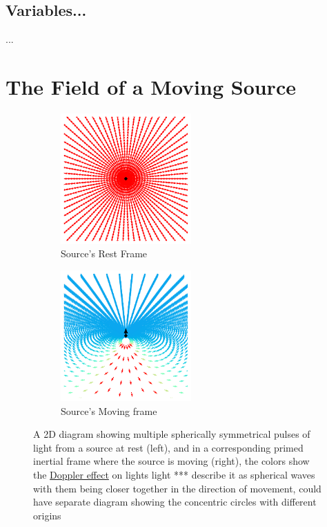 \section{Variables...}

...

\chapter{The Field of a Moving Source}

\begin{figure}[H]
	\begin{subfigure}{.49\textwidth}
		\centering
		\includegraphics[width=5cm]{images/pdf/Field_Rest_Frame.pdf}
		\caption{Source's Rest Frame}
	\end{subfigure}
	\begin{subfigure}{.49\textwidth}
		\centering
		\includegraphics[width=5cm]{images/pdf/Field_Moving_Frame_Doppler.pdf}
		\caption{Source's Moving frame}
	\end{subfigure}
	\caption{A 2D diagram showing multiple spherically symmetrical pulses of light from a source at rest (left), and in a corresponding primed inertial frame where the source is moving (right), the colors show the \protect\hyperlink{def-doppler-effect}{Doppler effect} on lights light *** describe it as spherical waves with them being closer together in the direction of movement, could have separate diagram showing the concentric circles with different origins}
	\label{fig: full field transformation 2}
\end{figure}

